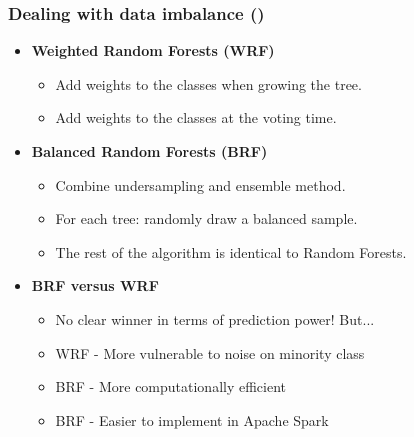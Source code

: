 \documentclass[slidestop,compress,red,mathserif]{beamer}
\begin{document}
\begin{frame}
\frametitle{Dealing with data imbalance (\cite{Chen2004})}
\begin{itemize}
  \item[] \textbf{Weighted Random Forests (WRF)}
    \begin{itemize}
      \item Add weights to the classes when growing the tree.
      \item Add weights to the classes at the voting time.
    \end{itemize}

  \item[] \textbf{Balanced Random Forests (BRF)}
    \begin{itemize}
      \item Combine undersampling and ensemble method.
      \item For each tree: randomly draw a balanced sample.
      \item The rest of the algorithm is identical to Random Forests.
    \end{itemize}

  \item[] \textbf{BRF versus WRF}
    \begin{itemize}
      \item No clear winner in terms of prediction power! But...
      \item WRF - More vulnerable to noise on minority class
      \item BRF - More computationally efficient
      \item BRF - Easier to implement in Apache Spark
    \end{itemize}
\end{itemize}
\end{frame}
\end{document}
